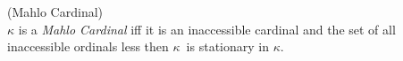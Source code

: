 \begin{definition}{(Mahlo Cardinal)}\label{def:mahlo_cardinal}\\
$\kappa$ is a \emph{Mahlo Cardinal} iff it is an inaccessible cardinal and the set of all inaccessible ordinals less then $\kappa$ is stationary in $\kappa$.
\end{definition}

\begin{comment} %

We have transcended $\sf{ZFC}$, but that is just a~start. Naturally, we could go on and consider the next inaccessible cardinal, which is inaccessible with respect to the theory $\sf{ZFC} + \exists \kappa (V_\kappa \models \sf{ZFC})$. But let's try to find a faster way up, informally at first. 

Since we can find an inaccessible set larger than any chosen set $M_0$, it is clear that there are arbitrarily large inaccessible cardinals in $V$, they are ``unbounded''\footnote{The notion is formally defined for sets, but the meaning should be obvious.} in $V$. If $V$ were a cardinal, we could say that there are $V$ inaccessible cardinals less than $V$, but this statement of course makes no sense in set theory as is because $V$ is not a set. But being more careful, we could find a property that can be formalized in second-order logic and reflect it to an initial segment of $V$. That would allow us to construct large cardinals more efficiently than by adding inaccessibles one by one. The property we are looking for ought to look like something like this (the following statement is not a mathematical  statement in a strict sense):
\begin{equation}
\begin{gathered}
\kappa \mbox{ is an inaccessible cardinal and}\\
\mbox{there are }\kappa\mbox{ inaccessible cardinals }\mu\ <\ \kappa
\end{gathered}
\end{equation}
This is in fact a fixed-point type of statement. We shall call those cardinals hyper-inaccessible. Now consider the following definition.

\begin{definition}{$0$-inaccessible Cardinal}\\
A cardinal $\kappa$ is $0$-inaccessible if it is inaccessible.
\end{definition}
We can define \emph{$\alpha$-weakly-inaccessible} cardinals analogously with the only difference that those are limit, not strongly limit.


\end{comment}
